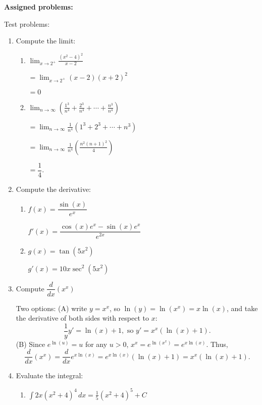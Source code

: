 \documentclass[12pt]{article}
\newcommand{\di}{\displaystyle}
\begin{document}
\textbf{Assigned problems:}

Test problems: 
  \begin{enumerate}
    \item Compute the limit:
    \begin{multicols}{2}
    \begin{enumerate}
    \item $\di \lim_{x\to 2^+}\frac{(x^2-4)^2}{x-2}$
    
    $=\lim_{x\to 2^+}(x-2)(x+2)^2$
    
    $=0$
    \columnbreak
    \item $\di \lim_{n\to\infty}\left(\frac{1^3}{n^4}+\frac{2^3}{n^4}+\cdots + \frac{n^3}{n^4}\right)$
    
    $\di =\lim_{n\to\infty}\frac{1}{n^4}(1^3+2^3+\cdots+n^3)$
    
    $\di =\lim_{n\to\infty}\frac{1}{n^4}\left(\frac{n^2(n+1)^2}{4}\right)$
    
    $=\dfrac{1}{4}.$
    \end{enumerate}
\end{multicols}


    \item Compute the derivative:
    \begin{multicols}{2}
    \begin{enumerate}
    \item $f(x) = \dfrac{\sin(x)}{e^x}$
    
    $f'(x)=\dfrac{\cos(x)e^x-\sin(x)e^x}{e^{2x}}$
    
    \item $\di g(x)= \tan(5x^2)$
    
    $g'(x)=10x\sec^2(5x^2)$
    
    
    \end{enumerate}
    \end{multicols}
    
    
    \item Compute $\dfrac{d}{dx}(x^x)$
    
    Two options: (A) write $y=x^x$, so $\ln(y)=\ln(x^x)=x\ln(x)$, and take the derivative of both sides with respect to $x$: 
    \[
    \frac{1}{y}y'=\ln(x)+1, \text{ so } y'=x^x(\ln(x)+1).
    \]
    (B) Since $e^{\ln(u)}=u$ for any $u>0$, $x^x=e^{\ln(x^x)}=e^{x\ln(x)}$. Thus,
    \[
    \frac{d}{dx}(x^x)=\frac{d}{dx}e^{x\ln(x)}=e^{x\ln(x)}(\ln(x)+1)=x^x(\ln(x)+1).
    \]
    
    \item Evaluate the integral:
    \begin{multicols}{2}
    \begin{enumerate}
    \item $\di\int 2x(x^2+4)^4\,dx=\frac15 (x^2+4)^5+C$
    


\end{enumerate}
\end{multicols}
\end{enumerate}
\end{document}
